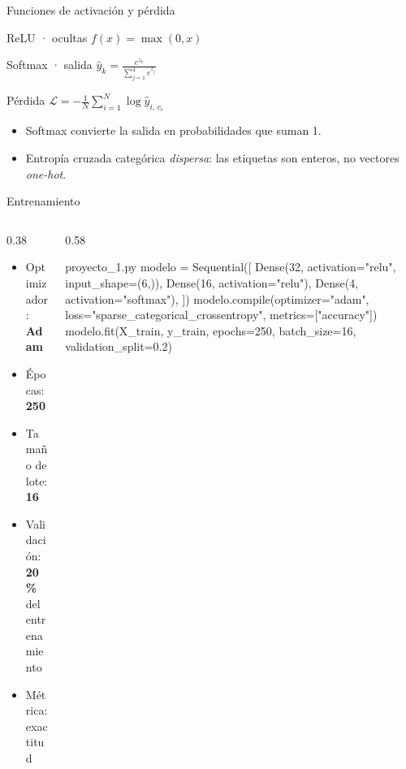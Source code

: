 \documentclass[10pt,aspectratio=169]{beamer}
\begin{document}
\begin{frame}{Funciones de activación y pérdida}
  \begin{tcbraster}[raster columns=3, raster equal height, raster column skip=5mm,
                    raster force size=false,
                    raster every box/.style={valign=center, halign=center}]
    \begin{ventanat}{ReLU · ocultas}
      \( f(x) = \max(0, x) \)
    \end{ventanat}
    \begin{ventanat}{Softmax · salida}
      \( \displaystyle \hat{y}_k = \frac{e^{z_k}}{\sum_{j=1}^{4} e^{z_j}} \)
    \end{ventanat}
    \begin{ventanat}{Pérdida}
      \( \displaystyle \mathcal{L} = -\frac{1}{N} \sum_{i=1}^{N} \log \hat{y}_{i,\,c_i} \)
    \end{ventanat}
  \end{tcbraster}

  \vspace{1.4em}
  \small
  \begin{itemize}
    \setlength{\itemsep}{0.4em}
    \item Softmax convierte la salida en probabilidades que suman 1.
    \item Entropía cruzada categórica \emph{dispersa}: las etiquetas son
          enteros, no vectores \emph{one-hot}.
  \end{itemize}
\end{frame}

\begin{frame}[fragile]{Entrenamiento}
  \begin{columns}[c]
    \begin{column}{0.38\textwidth}
      \begin{itemize}
        \setlength{\itemsep}{0.5em}
        \item Optimizador: \textbf{Adam}
        \item Épocas: \textbf{250}
        \item Tamaño de lote: \textbf{16}
        \item Validación: \textbf{20\,\%} del entrenamiento
        \item Métrica: exactitud
      \end{itemize}
    \end{column}
    \begin{column}{0.58\textwidth}
\begin{codigo}{proyecto\_1.py}
modelo = Sequential([
    Dense(32, activation="relu", input_shape=(6,)),
    Dense(16, activation="relu"),
    Dense(4, activation="softmax"),
])
modelo.compile(optimizer="adam",
               loss="sparse_categorical_crossentropy",
               metrics=["accuracy"])
modelo.fit(X_train, y_train, epochs=250,
           batch_size=16, validation_split=0.2)
\end{codigo}
    \end{column}
  \end{columns}
\end{frame}
\end{document}
